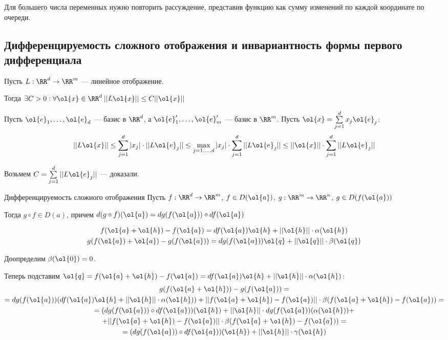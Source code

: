 Для большего числа переменных нужно повторить рассуждение,
представив функцию как сумму изменений по каждой координате по очереди.

\subsection{Дифференцируемость сложного отображения и инвариантность формы первого дифференциала}

\begin{prop}{}{}
    Пусть \( L : \RR^d \to \RR^m \) --- линейное отображение.

    Тогда \( \exists C > 0 : \forall \ol{x} \in \RR^d \: || L \ol{x} || \leq C || \ol{x} || \)
\end{prop}

Пусть \( \ol{e}_1, \ldots, \ol{e}_d \) --- базис в \( \RR^d \),
а \( \ol{e}_1', \ldots, \ol{e}_m' \) --- базис в \( \RR^m \).
Пусть \( \ol{x} = \sum\limits_{j = 1}^{d} x_j \ol{e}_j \):
\[
    || L \ol{x} ||
    \leq
    \sum\limits_{j = 1}^{d} |x_j| \cdot || L \ol{e}_j ||
    \leq
    \max\limits_{j = 1, \ldots, d} |x_j| \cdot \sum\limits_{j = 1}^{d} || L \ol{e}_j ||
    \leq
    || \ol{x} || \cdot \sum\limits_{j = 1}^{d} || L \ol{e}_j ||
\]

Возьмем \( C = \sum\limits_{j = 1}^{d} || L \ol{e}_j || \) --- доказали.

\begin{thrm}{Дифференцируемость сложного отображения}{}
    Пусть \( f : \RR^d \to \RR^m \), \( f \in D(\ol{a}) \), \( g : \RR^m \to \RR^n \), \( g \in D(f(\ol{a})) \)

    Тогда \( g \circ f \in D(a) \), причем \( d (g \circ f) (\ol{a}) = dg(f(\ol{a})) \circ df (\ol{a}) \)
\end{thrm}
\begin{gather*}
    f(\ol{a} + \ol{h}) - f(\ol{a}) = df(\ol{a}) \ol{h} + || \ol{h} || \cdot \alpha (\ol{h})
    \\
    g(f(\ol{a}) + \ol{a}) - g(f(\ol{a})) = dg(f(\ol{a})) \ol{q} + || \ol{q} || \cdot \beta (\ol{q})
\end{gather*}

Доопределим \( \beta(\ol{0}) = 0 \).

Теперь подставим \( \ol{q} = f(\ol{a} + \ol{h}) - f(\ol{a}) = df(\ol{a}) \ol{h} + || \ol{h} || \cdot \alpha (\ol{h}) \):
\begin{gather*}
    g(f(\ol{a} + \ol{h})) - g(f(\ol{a}))
    =
    \\
    =
    dg(f(\ol{a})) ( df(\ol{a}) \ol{h} + || \ol{h} || \cdot \alpha (\ol{h}) )
        +
        || f(\ol{a} + \ol{h}) - f(\ol{a}) || \cdot \beta (f(\ol{a} + \ol{h}) - f(\ol{a}))
    =
    \\
    =
    (dg(f(\ol{a})) \circ df (\ol{a})) ( \ol{h} )
        +
        || \ol{h} || \cdot dg ( f(\ol{a}) ) ( \alpha(\ol{h}) )
        +
        \\
        +
        || f(\ol{a} + \ol{h}) - f(\ol{a}) || \cdot \beta (f(\ol{a} + \ol{h}) - f(\ol{a}))
    =
    \\
    =
    (dg(f(\ol{a})) \circ df (\ol{a})) ( \ol{h} ) + || \ol{h} || \cdot \gamma (\ol{h})
\end{gather*}

